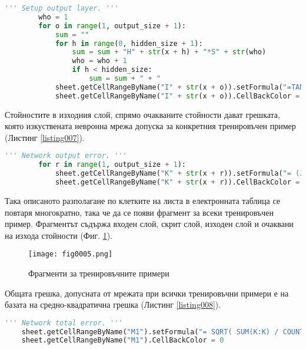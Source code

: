 \begin{lstlisting}[caption=Стойности на изходния слой при правия пас, language=Python, basicstyle=\tiny, label=listing006]
        ''' Setup output layer. '''
        who = 1
        for o in range(1, output_size + 1):
            sum = ""
            for h in range(0, hidden_size + 1):
                sum = sum + "H" + str(x + h) + "*S" + str(who)
                who = who + 1
                if h < hidden_size:
                    sum = sum + " + "
            sheet.getCellRangeByName("I" + str(x + o)).setFormula("=TANH( " + sum + " )")
            sheet.getCellRangeByName("I" + str(x + o)).CellBackColor = (0 << 16 | 255 << 8 | 0)
\end{lstlisting}

Стойностите в изходния слой, спрямо очакваните стойности дават грешката, която изкуствената невронна мрежа допуска за конкретния тренировъчен пример (Листинг \ref{listing007}).

\begin{lstlisting}[caption=Стойност на грешката допусната от мрежата за конкретния пример, language=Python, basicstyle=\tiny, label=listing007]
        ''' Network output error. '''
        for r in range(1, output_size + 1):
            sheet.getCellRangeByName("K" + str(x + r)).setFormula("= (J" + str(x + r) + "-I" + str(x + r) + ") * (J" + str(x + r) + "-I" + str(x + r) + ")")
            sheet.getCellRangeByName("K" + str(x + r)).CellBackColor = (0 << 16 | 255 << 8 | 255)
\end{lstlisting}

Така описаното разполагане по клетките на листа в електронната таблица се повтаря многократно, така че да се появи фрагмент за всеки тренировъчен пример. Фрагментът съдържа входен слой, скрит слой, изходен слой и очаквани на изхода стойности (Фиг. \ref{fig005}).

\begin{figure}[H]
  \centering
  \texttt{[image: fig0005.png]}
  \caption{Фрагменти за тренировъчните примери}
\label{fig005}
\end{figure}

Общата грешка, допусната от мрежата при всички тренировъчни примери е на базата на средно-квадратична грешка (Листинг \ref{listing008}).

\begin{lstlisting}[caption=Обща средно-квадратична грешка на мрежата, language=Python, basicstyle=\tiny, label=listing008]
    ''' Network total error. '''
    sheet.getCellRangeByName("M1").setFormula("= SQRT( SUM(K:K) / COUNT(K:K) )")
    sheet.getCellRangeByName("M1").CellBackColor = 0
\end{lstlisting}

